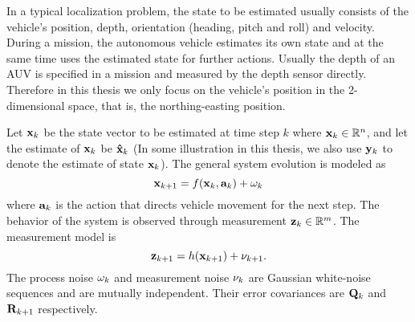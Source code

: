 In a typical localization problem, the state to be estimated usually consists of the vehicle's position, depth, orientation (heading, pitch and roll) and velocity. During a mission, the autonomous vehicle estimates its own state and at the same time uses the estimated state for further actions. Usually the depth of an AUV is specified in a mission and measured by the depth sensor directly. Therefore in this thesis we only focus on the vehicle's position in the 2-dimensional space, that is, the northing-easting position.

Let ${\bf x}_k$ be the state vector to be estimated at time step $k$ where ${\bf x}_k\in\mathbb{R}^n$, and let the estimate of ${\bf x}_k$ be ${\bf \hat x}_k$ (In some illustration in this thesis, we also use ${\bf y}_k$ to denote the estimate of state ${\bf x}_k$).  The general system evolution is modeled as
\begin{equation}
\label{eq:propagation}
{\bf x}_{k+1}=f({\bf x}_k,{\bf a}_k)+{\bf\omega}_k
\end{equation}
where ${\bf a}_k$ is the action that directs vehicle movement for the next step. The behavior of the system is observed through measurement ${\bf z}_k\in\mathbb{R}^m$. The measurement model is
\begin{equation}
\label{eq:measurement}
{\bf z}_{k+1}=h({\bf x}_{k+1})+{\bf\nu}_{k+1}.
\end{equation}
The process noise ${\bf\omega}_k$ and measurement noise ${\bf\nu}_k$ are Gaussian white-noise sequences and are mutually independent. Their error covariances are ${\bf Q}_k$ and ${\bf R}_{k+1}$ respectively.

